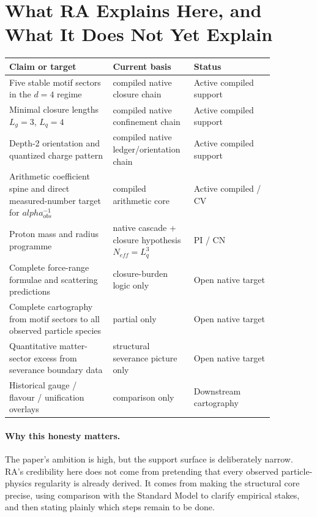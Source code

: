 \documentclass[11pt]{article}
\def\alpha{alpha}%
\def\mathrm#1{#1}%
\begin{document}
\section{What RA Explains Here, and What It Does Not Yet Explain}

\begin{center}
\small
\begin{longtable}{p{0.36\linewidth}p{0.22\linewidth}p{0.28\linewidth}}
\toprule
Claim or target & Current basis & Status \\
\midrule
Five stable motif sectors in the $d=4$ regime & compiled native closure chain & Active compiled support \\
Minimal closure lengths $L_g=3$, $L_q=4$ & compiled native confinement chain & Active compiled support \\
Depth-2 orientation and quantized charge pattern & compiled native ledger/orientation chain & Active compiled support \\
Arithmetic coefficient spine and direct measured-number target for $\alpha^{-1}_{\mathrm{obs}}$ & compiled arithmetic core & Active compiled / CV \\
Proton mass and radius programme & native cascade + closure hypothesis $N_{\mathrm{eff}}=L_q^3$ & PI / CN \\
Complete force-range formulae and scattering predictions & closure-burden logic only & Open native target \\
Complete cartography from motif sectors to all observed particle species & partial only & Open native target \\
Quantitative matter-sector excess from severance boundary data & structural severance picture only & Open native target \\
Historical gauge / flavour / unification overlays & comparison only & Downstream cartography \\
\bottomrule
\end{longtable}
\end{center}

\paragraph{Why this honesty matters.} The paper's ambition is high, but the support surface is deliberately narrow. RA's credibility here does not come from pretending that every observed particle-physics regularity is already derived. It comes from making the structural core precise, using comparison with the Standard Model to clarify empirical stakes, and then stating plainly which steps remain to be done.
\end{document}
